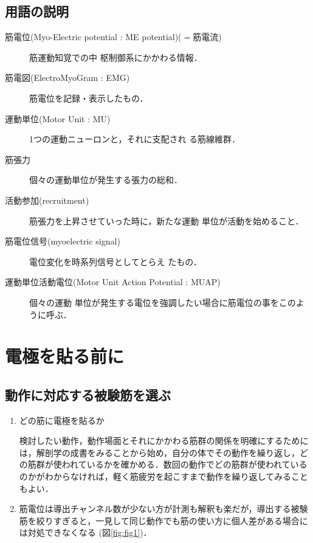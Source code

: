 \documentclass[10pt,twocolumn]{jarticle}
\begin{document}
\subsection{用語の説明}
\begin{description}
\item[筋電位(Myo-Electric potential : ME potential)($=$筋電流)] 筋運動知覚での中
  枢制御系にかかわる情報．
\item[筋電図(ElectroMyoGram : EMG)] 筋電位を記録・表示したもの．
\item[運動単位(Motor Unit : MU)] 1つの運動ニューロンと，それに支配され
  る筋線維群．
\item[筋張力] 個々の運動単位が発生する張力の総和．
\item[活動参加(recruitment)] 筋張力を上昇させていった時に，新たな運動
  単位が活動を始めること．
\item[筋電位信号(myoelectric signal)] 電位変化を時系列信号としてとらえ
  たもの．
\item[運動単位活動電位(Motor Unit Action Potential : MUAP)] 個々の運動
  単位が発生する電位を強調したい場合に筋電位の事をこのように呼ぶ．
\end{description}


\section{電極を貼る前に}

\subsection{動作に対応する被験筋を選ぶ}

\begin{enumerate}
\item どの筋に電極を貼るか

	検討したい動作，動作場面とそれにかかわる筋群の関係を明確にするためには，解剖学の成書をみることから始め，自分の体でその動作を繰り返し，どの筋群が使われているかを確かめる．数回の動作でどの筋群が使われているのかがわからなければ，軽く筋疲労を起こすまで動作を繰り返してみることもよい．
	
\item 筋電位は導出チャンネル数が少ない方が計測も解釈も楽だが，導出する被験筋を絞りすぎると，一見して同じ動作でも筋の使い方に個人差がある場合には対処できなくなる (図\ref{fig:fig1})．
\end{enumerate}
\end{document}
